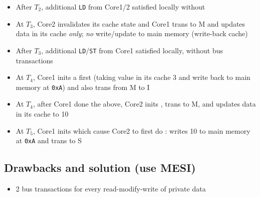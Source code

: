 \begin{itemize}
\item After $T_2$, additional \texttt{LD} from Core1/2 satisfied locally without 
\item At $T_3$, Core2 invalidates its cache state and Core1 trans to \textsf{M} and updates data in its cache \emph{only}; \emph{no} write/update to main memory (write-back cache)
\item After $T_3$, additional \texttt{LD}/\texttt{ST} from Core1 satisfied locally, without bus transactions
\item At $T_4$, Core1 inits a  first (taking value in its cache 3 and write back to main memory at \texttt{0xA}) and also trans from \textsf{M} to \textsf{I}
\item At $T_4$, after Core1 done the above, Core2 inits , trans to \textsf{M}, and updates data in its cache to 10
\item At $T_5$, Core1 inits  which cause Core2 to first do : writes 10 to main memory at \texttt{0xA} and trans to \textsf{S}
\end{itemize}
\subsection*{Drawbacks and solution (use MESI)}
\begin{itemize}
\item 2 bus transactions for every read-modify-write of private data
\end{itemize}
\columnbreak


